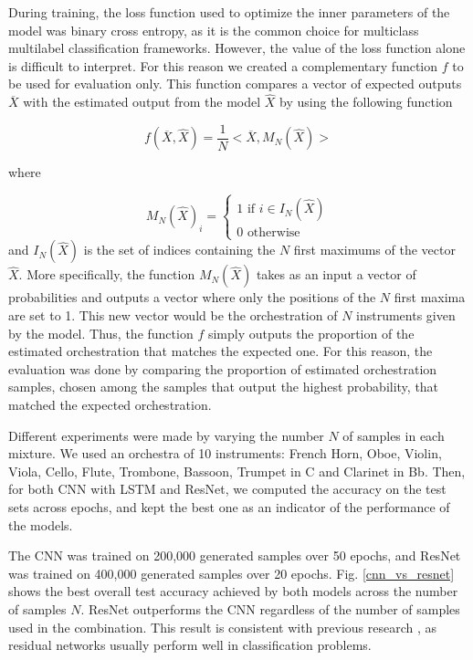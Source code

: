 \documentclass[runningheads,a4paper]{llncs}
\begin{document}
During training, the loss function used to optimize the inner parameters of the model was binary cross entropy, as it is the common choice for multiclass multilabel classification frameworks. However, the value of the loss function alone is difficult to interpret. For this reason we created a complementary function $f$ to be used for evaluation only. This function compares a vector of expected outputs $\overline{X}$ with the estimated output from the model $\hat{X}$ by using the following function

\begin{equation}
f(\overline{X}, \hat{X}) = \frac{1}{N}<\overline{X}, M_N(\hat{X})>
\label{eval}
\end{equation}

where

\begin{equation}
M_N(\hat{X})_i = \left\{\begin{array}{ll}
1 \text{ if } i \in I_N(\hat{X})\\
0 \text{ otherwise}
\end{array}\right.
\label{NMax}
\end{equation}
and $I_N(\hat{X})$ is the set of indices containing the $N$ first maximums of the vector $\hat{X}$. More specifically, the function $M_N(\hat{X})$ takes as an input a vector of probabilities and outputs a vector where only the positions of the $N$ first maxima are set to 1. This new vector would be the orchestration of $N$ instruments given by the model. Thus, the function $f$ simply outputs the proportion of the estimated orchestration that matches the expected one.
For this reason, the evaluation was done by comparing the proportion of estimated orchestration samples, chosen among the samples that output the highest probability, that matched the expected orchestration.

Different experiments were made by varying the number $N$ of samples in each mixture. We used an orchestra of 10 instruments: French Horn, Oboe, Violin, Viola, Cello, Flute, Trombone, Bassoon, Trumpet in C and Clarinet in Bb. Then, for both CNN with LSTM and ResNet, we computed the accuracy on the test sets across epochs, and kept the best one as an indicator of the performance of the models.

The CNN was trained on 200,000 generated samples over 50 epochs, and ResNet was trained on 400,000 generated samples over 20 epochs. Fig. \ref{cnn_vs_resnet} shows the best overall test accuracy achieved by both models across the number of samples $N$.
ResNet outperforms the CNN regardless of the number of samples used in the combination. This result is consistent with previous research \cite{He15}, as residual networks usually perform well in classification problems.
\end{document}
